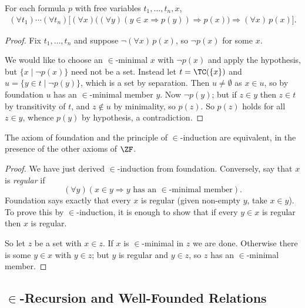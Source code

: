 \begin{theorem}\label{thm:epsiloninduction}
  For each formula $p$ with free variables $t_1, \dots, t_n, x$,
  \begin{align*}
  \left(\forall t_1\right) \cdots\left(\forall t_n\right)\bigl[(\forall x)\bigl((\forall y)(y \in x \Rightarrow p(y)) \Rightarrow p(x)\bigr) \Rightarrow(\forall x)\,p(x)\bigr].
  \end{align*}
\end{theorem}
\begin{proof}
  Fix $t_1, \dots, t_n$ and suppose $\lnot(\forall x)\,p(x)$, so $\lnot p(x)$ for some $x$.

  We would like to choose an $\in$-minimal $x$ with $\lnot p(x)$ and apply the hypothesis, but $\{x \mid \lnot p(x)\}$ need not be a set. Instead let $t = \TC(\{x\})$ and $u = \{y \in t \mid \lnot p(y)\}$, which is a set by separation. Then $u \neq \emptyset$ as $x \in u$, so by foundation $u$ has an $\in$-minimal member $y$. Now $\lnot p(y)$; but if $z \in y$ then $z \in t$ by transitivity of $t$, and $z \notin u$ by minimality, so $p(z)$. So $p(z)$ holds for all $z \in y$, whence $p(y)$ by hypothesis, a contradiction.
\end{proof}

\begin{theorem}
  The axiom of foundation and the principle of $\in$-induction are equivalent, in the presence of the other axioms of $\ZF$.
\end{theorem}
\begin{proof}
  We have just derived $\in$-induction from foundation. Conversely, say that $x$ is \emph{regular} if
  $$(\forall y)(x \in y \Rightarrow y \text{ has an } \in\text{-minimal member}).$$
  Foundation says exactly that every $x$ is regular (given non-empty $y$, take $x \in y$). To prove this by $\in$-induction, it is enough to show that if every $y \in x$ is regular then $x$ is regular.

  So let $z$ be a set with $x \in z$. If $x$ is $\in$-minimal in $z$ we are done. Otherwise there is some $y \in x$ with $y \in z$; but $y$ is regular and $y \in z$, so $z$ has an $\in$-minimal member.
\end{proof}

\subsection{\texorpdfstring{$\in$}{Epsilon}-Recursion and Well-Founded Relations}


